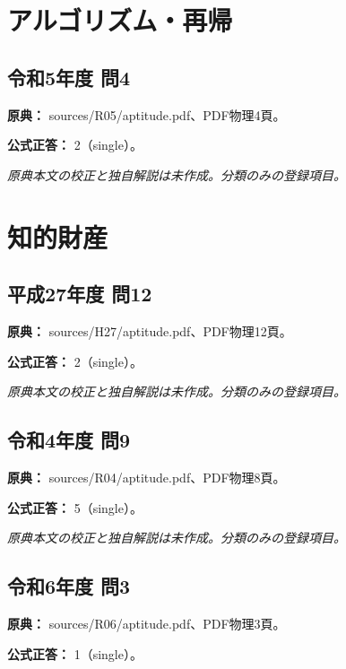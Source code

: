\section{アルゴリズム・再帰}

\subsection{令和5年度 問4}
\label{q:r05-reg-apt-04}

\noindent\textbf{原典：} sources/R05/aptitude.pdf、PDF物理4頁。

\textbf{公式正答：} 2（single）。

\par\textit{原典本文の校正と独自解説は未作成。分類のみの登録項目。}

\section{知的財産}

\subsection{平成27年度 問12}
\label{q:h27-reg-apt-12}

\noindent\textbf{原典：} sources/H27/aptitude.pdf、PDF物理12頁。

\textbf{公式正答：} 2（single）。

\par\textit{原典本文の校正と独自解説は未作成。分類のみの登録項目。}

\subsection{令和4年度 問9}
\label{q:r04-reg-apt-09}

\noindent\textbf{原典：} sources/R04/aptitude.pdf、PDF物理8頁。

\textbf{公式正答：} 5（single）。

\par\textit{原典本文の校正と独自解説は未作成。分類のみの登録項目。}

\subsection{令和6年度 問3}
\label{q:r06-reg-apt-03}

\noindent\textbf{原典：} sources/R06/aptitude.pdf、PDF物理3頁。

\textbf{公式正答：} 1（single）。

